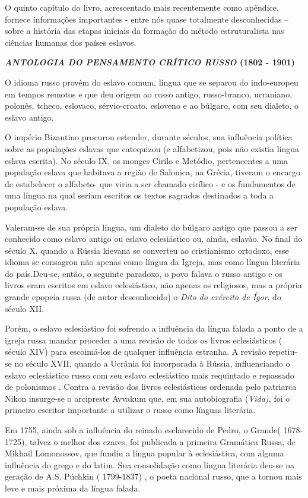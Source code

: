 O quinto capítulo do livro, acrescentado mais recentemente como
apêndice, fornece informações importantes - entre nós quase totalmente
desconhecidas -- sobre a história das etapas iniciais da formação do
método estruturalista nas ciências humanas dos países eslavos.

\textbf{\emph{ANTOLOGIA DO PENSAMENTO CRÍTICO RUSSO} (1802 - 1901) }

O idioma russo provém do eslavo comum, língua que se separou do
indo-europeu em tempos remotos e que deu origem ao russo antigo,
russo-branco, ucraniano, polonês, tcheco, eslovaco, sérvio-croato,
esloveno e ao búlgaro, com seu dialeto, o eslavo antigo.

O império Bizantino procurou estender, durante séculos, sua influência
política sobre as populações eslavas que catequizou (e alfabetizou, pois
não existia língua eslava escrita). No século IX, os monges Cirilo e
Metódio, pertencentes a uma população eslava que habitava a região de
Salonica, na Grécia, tiveram o encargo de estabelecer o alfabeto- que
viria a ser chamado cirílico - e os fundamentos de uma língua na qual
seriam escritos os textos sagrados destinados a toda a população eslava.

Valeram-se de sua própria língua, um dialeto do búlgaro antigo que
passou a ser conhecido como eslavo antigo ou eslavo eclesiástico ou,
ainda, eslavão. No final do século X, quando a Rússia kievana se
converteu ao cristianismo ortodoxo, esse idioma se consagrou não apenas
como língua da Igreja, mas como língua literária do país.Deu-se, então,
o seguinte paradoxo, o povo falava o russo antigo e os livros eram
escritos em eslavo eclesiástico, não apenas os religiosos, mas a própria
grande epopeia russa (de autor desconhecido) o \emph{Dito do exército de
Ígor}, do século XII.

Porém, o eslavo eclesiástico foi sofrendo a influência da língua falada
a ponto de a igreja russa mandar proceder a uma revisão de todos os
livros eclesiásticos ( século XIV) para escoimá-los de qualquer
influência estranha. A revisão repetiu-se no século XVII, quando a
Ucrânia foi incorporada à Rússia, influenciando o eslavo eclesiástico
russo com seu eslavo eclesiástico mais requintado e repassado de
polonismos . Contra a revisão dos livros eclesiásticos ordenada pelo
patriarca Nikon insurge-se o arcipreste Avvakum que, em sua
autobiografia (\emph{Vida),} foi o primeiro escritor importante a
utilizar o russo como línguas literária.

Em 1755, ainda sob a influência do reinado esclarecido de Pedro, o
Grande( 1678-1725), talvez o melhor dos czares, foi publicada a primeira
Gramática Russa, de Mikhail Lomonossov, que fundiu a língua popular à
eclesiástica, com alguma influência do grego e do latim. Sua
consolidação como língua literária deu-se na geração de A.S. Púchkin (
1799-1837) , o poeta nacional russo, que a tornou mais leve e mais
próxima da língua falada.

